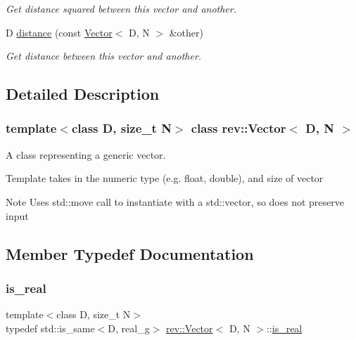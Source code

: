 \begin{DoxyCompactItemize}
\begin{DoxyCompactList}\small\item\em Get distance squared between this vector and another. \end{DoxyCompactList}\item 
\mbox{\label{classrev_1_1_vector_ad8aaf19ed0f521fb342a77ae2f763853}} 
D \mbox{\hyperlink{classrev_1_1_vector_ad8aaf19ed0f521fb342a77ae2f763853}{distance}} (const \mbox{\hyperlink{classrev_1_1_vector}{Vector}}$<$ D, N $>$ \&other)
\begin{DoxyCompactList}\small\item\em Get distance between this vector and another. \end{DoxyCompactList}\end{DoxyCompactItemize}


\subsection{Detailed Description}
\subsubsection*{template$<$class D, size\+\_\+t N$>$\newline
class rev\+::\+Vector$<$ D, N $>$}

A class representing a generic vector. 

Template takes in the numeric type (e.\+g. float, double), and size of vector \begin{DoxyNote}{Note}
Uses std\+::move call to instantiate with a std\+::vector, so does not preserve input 
\end{DoxyNote}


\subsection{Member Typedef Documentation}
\mbox{\label{classrev_1_1_vector_ac0b5c5c0f27e3365986497a0e01168f0}} 
\subsubsection{\texorpdfstring{is\_real}{is\_real}}
{\footnotesize\ttfamily template$<$class D, size\+\_\+t N$>$ \\
typedef std\+::is\+\_\+same$<$D, real\+\_\+g$>$ \mbox{\hyperlink{classrev_1_1_vector}{rev\+::\+Vector}}$<$ D, N $>$\+::\mbox{\hyperlink{classrev_1_1_vector_ac0b5c5c0f27e3365986497a0e01168f0}{is\+\_\+real}}}



